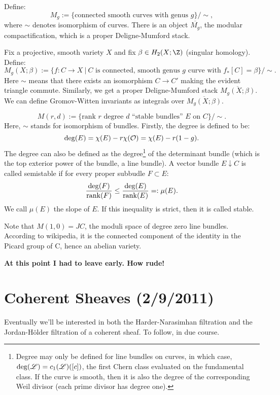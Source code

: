 \documentclass[11pt]{article}
\newcommand{\NewLecture}[3]{\section{#1 {\small(#2/#3/2011)}}}
\begin{document}
\begin{exmp*}
Define:
\[M_g:=\{\text{connected smooth curves with genus $g$}\}/\sim,\]
where $\sim$ denotes isomorphism of curves. There is an object $\overline{M_g}$,
the modular compactification, which is a proper Deligne-Mumford stack.
\end{exmp*}
\begin{exmp*}
Fix a projective, smooth variety $X$ and fix $\beta\in H_2(X;\Z)$ (singular
homology). Define:
\[M_g(X;\beta):=\{f:C\to X\ |\ \text{$C$ is connected, smooth genus $g$ curve
with $f_*[C]=\beta$}\}/\sim.\]
Here $\sim$ means that there exists an isomorphism $C\to C'$ making the evident
triangle commute. Similarly, we get a proper Deligne-Mumford stack
$\overline{M_g(X;\beta)}$. We can define Gromov-Witten invariants as integrals
over $\overline{M_g(X;\beta)}$.
\end{exmp*}
\begin{exmp*}
\[M(r,d):=\{\text{rank $r$ degree $d$ ``stable bundles'' $E$ on $C$}\}/\sim.\]
Here, $\sim$ stands for isomorphism of bundles. Firstly, the degree is defined
to be:
\[\deg(E)=\chi(E)-r\chi(\mathcal{O})=\chi(E)-r(1-g).\]
The degree can also be defined as the degree\footnote{Degree may only be defined
for line bundles on curves, in which case, $\deg(\mathscr{L})=c_1(\mathscr{L})([c])$, the
first Chern class evaluated on the fundamental class. If the curve is smooth,
then it is also the degree of the corresponding Weil divisor (each prime divisor
has degree one).} of the determinant bundle (which is the top exterior power of
the bundle, a line bundle). A vector bundle $E\downarrow C$ is called semistable
if for every proper subbudle $F\subset E$:
\[\frac{\deg(F)}{\operatorname{rank}(F)}\leq\frac{\deg(E)}{\operatorname{rank}(E)}=:\mu(E).\]
We call $\mu(E)$ the slope of $E$. If this inequality is strict, then it is
called stable.

Note that $M(1,0)=JC$, the moduli space of degree zero line bundles. According
to wikipedia, it is the connected component of the identity in the Picard group
of C, hence an abelian variety.

\textbf{At this point I had to leave early. How rude!}
\end{exmp*}
\NewLecture{Coherent Sheaves}{2}{9}
Eventually we'll be interested in both the Harder-Narasimhan filtration and the
Jordan-H\"older filtration of a coherent sheaf. To follow, in due course.
\end{document}
